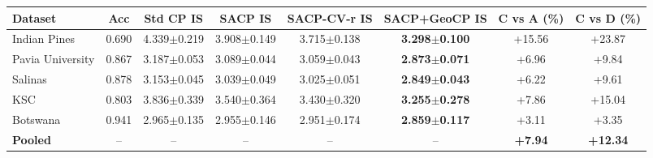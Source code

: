 \begin{tabular}{l|c|cccc|cc}
\toprule
Dataset & Acc & Std CP IS & SACP IS & SACP-CV-r IS & SACP+GeoCP IS & C vs A (\%) & C vs D (\%) \\
\midrule
Indian Pines & 0.690 & 4.339$\pm$0.219 & 3.908$\pm$0.149 & 3.715$\pm$0.138 & \textbf{3.298$\pm$0.100} & +15.56 & +23.87 \\
Pavia University & 0.867 & 3.187$\pm$0.053 & 3.089$\pm$0.044 & 3.059$\pm$0.043 & \textbf{2.873$\pm$0.071} & +6.96 & +9.84 \\
Salinas & 0.878 & 3.153$\pm$0.045 & 3.039$\pm$0.049 & 3.025$\pm$0.051 & \textbf{2.849$\pm$0.043} & +6.22 & +9.61 \\
KSC & 0.803 & 3.836$\pm$0.339 & 3.540$\pm$0.364 & 3.430$\pm$0.320 & \textbf{3.255$\pm$0.278} & +7.86 & +15.04 \\
Botswana & 0.941 & 2.965$\pm$0.135 & 2.955$\pm$0.146 & 2.951$\pm$0.174 & \textbf{2.859$\pm$0.117} & +3.11 & +3.35 \\
\midrule
\textbf{Pooled} & -- & -- & -- & -- & -- & \textbf{+7.94} & \textbf{+12.34} \\
\bottomrule
\end{tabular}